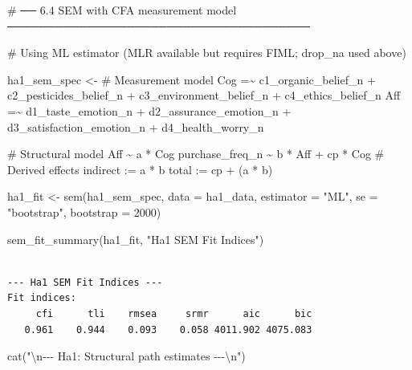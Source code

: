 \documentclass[
  letterpaper,
  DIV=11,
  numbers=noendperiod]{scrartcl}
\newenvironment{Shaded}{\begin{snugshade}}{\end{snugshade}}
\newcommand{\AttributeTok}[1]{\textcolor[rgb]{0.40,0.45,0.13}{#1}}
\newcommand{\CommentTok}[1]{\textcolor[rgb]{0.37,0.37,0.37}{#1}}
\newcommand{\DecValTok}[1]{\textcolor[rgb]{0.68,0.00,0.00}{#1}}
\newcommand{\FunctionTok}[1]{\textcolor[rgb]{0.28,0.35,0.67}{#1}}
\newcommand{\NormalTok}[1]{\textcolor[rgb]{0.00,0.23,0.31}{#1}}
\newcommand{\OtherTok}[1]{\textcolor[rgb]{0.00,0.23,0.31}{#1}}
\newcommand{\SpecialCharTok}[1]{\textcolor[rgb]{0.37,0.37,0.37}{#1}}
\newcommand{\StringTok}[1]{\textcolor[rgb]{0.13,0.47,0.30}{#1}}
\begin{document}
\begin{Shaded}
\begin{Highlighting}[]
\CommentTok{\# ── 6.4  SEM with CFA measurement model ──────────────────────────────────────}

\CommentTok{\# Using ML estimator (MLR available but requires FIML; drop\_na used above)}

\NormalTok{ha1\_sem\_spec }\OtherTok{\textless{}{-}} \StringTok{\textquotesingle{}}
\StringTok{  \# Measurement model}
\StringTok{  Cog =\textasciitilde{} c1\_organic\_belief\_n + c2\_pesticides\_belief\_n +}
\StringTok{         c3\_environment\_belief\_n + c4\_ethics\_belief\_n}
\StringTok{  Aff =\textasciitilde{} d1\_taste\_emotion\_n + d2\_assurance\_emotion\_n +}
\StringTok{         d3\_satisfaction\_emotion\_n + d4\_health\_worry\_n}

\StringTok{  \# Structural model}
\StringTok{  Aff           \textasciitilde{} a  * Cog}
\StringTok{  purchase\_freq\_n \textasciitilde{} b  * Aff + cp * Cog}
\StringTok{  \# Derived effects}
\StringTok{  indirect := a * b}
\StringTok{  total    := cp + (a * b)}
\StringTok{\textquotesingle{}}

\NormalTok{ha1\_fit }\OtherTok{\textless{}{-}} \FunctionTok{sem}\NormalTok{(ha1\_sem\_spec, }\AttributeTok{data =}\NormalTok{ ha1\_data,}
               \AttributeTok{estimator  =} \StringTok{"ML"}\NormalTok{,}
               \AttributeTok{se         =} \StringTok{"bootstrap"}\NormalTok{,}
               \AttributeTok{bootstrap  =} \DecValTok{2000}\NormalTok{)}

\FunctionTok{sem\_fit\_summary}\NormalTok{(ha1\_fit, }\StringTok{"Ha1 SEM Fit Indices"}\NormalTok{)}
\end{Highlighting}
\end{Shaded}

\begin{verbatim}

--- Ha1 SEM Fit Indices ---
Fit indices:
     cfi      tli    rmsea     srmr      aic      bic 
   0.961    0.944    0.093    0.058 4011.902 4075.083 
\end{verbatim}

\begin{Shaded}
\begin{Highlighting}[]
\FunctionTok{cat}\NormalTok{(}\StringTok{"}\SpecialCharTok{\textbackslash{}n}\StringTok{{-}{-}{-} Ha1: Structural path estimates {-}{-}{-}}\SpecialCharTok{\textbackslash{}n}\StringTok{"}\NormalTok{)}
\end{Highlighting}
\end{Shaded}
\end{document}
